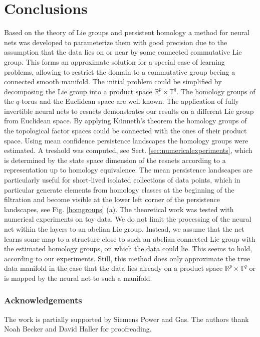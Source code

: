 \documentclass[envcountsect,runningheads]{llncs}
\begin{document}
\section{Conclusions}
\label{sec:conclusion}
Based on the theory of Lie groups and persistent homology a method for neural nets was developed to parameterize them with good precision due to the assumption that the data lies on or near by some connected commutative Lie group. This forms an approximate solution for a special case of learning problems, allowing to restrict the domain to a commutative group beeing a connected smooth manifold. The initial problem could be simplified by decomposing the Lie group into a product space $\mathbb{R}^p \times \mathbb{T}^q$. The homology groups of the $q$-torus and the Euclidean space are well known. The application of fully invertible neural nets to resnets demonstrates our results on a different Lie group from Euclidean space. By applying Künneth's theorem the homology groups of the topological factor spaces could be connected with the ones of their product space. Using mean confidence persistence landscapes the homology groups were estimated. A treshold was computed, see Sect. \ref{sec:numericalexperiments}, which is determined by the state space dimension of the resnets according to a representation up to homology equivalence. The mean persistence landscapes are particularly useful for short-lived isolated collections of data points, which in particular generate elements from homology classes at the beginning of the filtration and become visible at the lower left corner of the persistence landscapes, see Fig. \ref{homgroups} (a). The theoretical work was tested with numerical experiments on toy data. We do not limit the processing of the neural net within the layers to an abelian Lie group. Instead, we assume that the net learns some map to a structure close to such an abelian connected Lie group with the estimated homology groups, on which the data could lie. This seems to hold, according to our experiments. Still, this method does only approximate the true data manifold in the case that the data lies already on a product space $\mathbb{R}^p \times \mathbb{T}^q$ or is mapped by the neural net to such a manifold.

\subsubsection*{Acknowledgements} The work is partially supported by Siemens Power and Gas. The authors thank Noah Becker and David Haller for proofreading.
\end{document}
